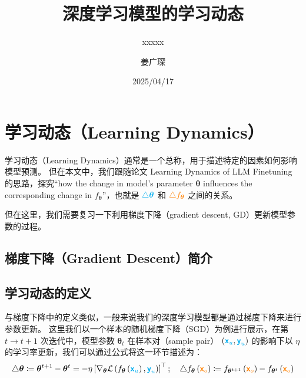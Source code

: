 \documentclass[citestyle=gb7714-2015, bibstyle=gb7714-2015,lang=cn,14pt,scheme=chinese]{elegantbook}
\title{深度学习模型的学习动态}
\subtitle{xxxxx}
\author{姜广琛}
\institute{西北工业大学}
\date{2025/04/17}
\begin{document}


\mainmatter%

\chapter{学习动态（Learning Dynamics）}

学习动态（Learning Dynamics）通常是一个总称，用于描述特定的因素如何影响模型预测。
但在本文中，我们跟随论文 Learning Dynamics of {LLM} Finetuning~\cite{DBLP:conf/iclr/RenS25} 的思路，探究“how the change in model's parameter \(\bm{\theta}\) influences the corresponding change in \(f_{\bm{\theta}}\)”，也就是 \(\textcolor{cyan}{\triangle \bm{\theta}}\) 和 \(\textcolor{orange}{\triangle f_{\bm{\theta}}}\) 之间的关系。

但在这里，我们需要复习一下利用梯度下降（gradient descent, GD）更新模型参数的过程。

\section{梯度下降（Gradient Descent）简介}



\section{学习动态的定义}

与梯度下降中的定义类似，一般来说我们的深度学习模型都是通过梯度下降来进行参数更新。
这里我们以一个样本的随机梯度下降（SGD）为例进行展示，在第 \(t \to t+1\) 次迭代中，模型参数 \(\bm{\theta}_{t}\) 在样本对（sample pair） \(\left( \textcolor{cyan}{\bm{\mathsf{x}}_{u}}, \textcolor{cyan}{\bm{\mathsf{y}}_{u}} \right)\) 的影响下以 \(\eta\) 的学习率更新，我们可以通过公式将这一环节描述为：
\begin{equation}\label{eq:SGD-loss_iterative_update}
    \triangle \bm{\theta} \coloneq \bm{\theta}^{t+1} - \bm{\theta}^{t} = - \eta \left[ \nabla_{\bm{\theta}} \mathcal{L} \left( f_{\bm{\theta}} \left( \textcolor{cyan}{\bm{\mathsf{x}}_{u}} \right), \textcolor{cyan}{\bm{\mathsf{y}}_{u}} \right) \right]^{\top} ; \quad \triangle f_{\bm{\theta}} \left( \textcolor{orange}{\bm{\mathsf{x}}_{o}} \right) \coloneq f_{\bm{\theta}^{t+1}} \left( \textcolor{orange}{\bm{\mathsf{x}}_{o}} \right) - f_{\bm{\theta}^{t}} \left( \textcolor{orange}{\bm{\mathsf{x}}_{o}} \right)
\end{equation}
\end{document}

